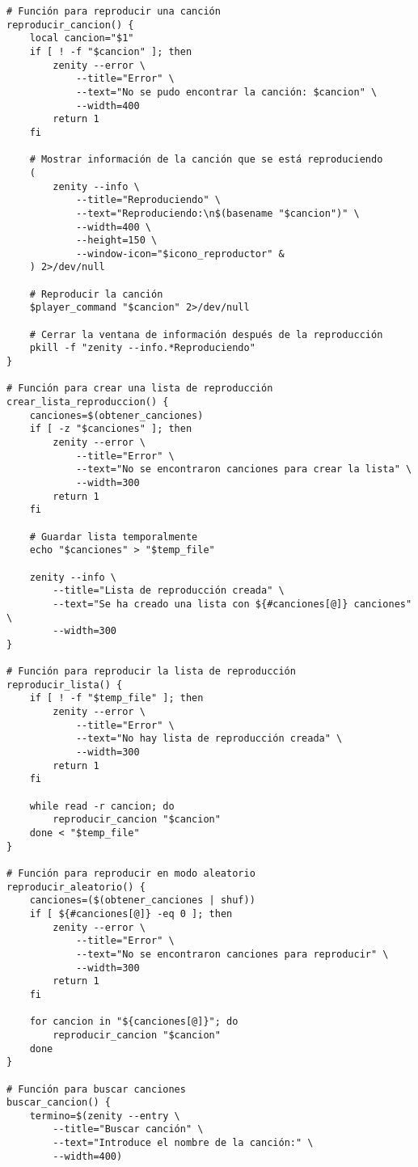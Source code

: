 \documentclass[12pt]{article}
\begin{document}
\begin{lstlisting}[caption={mp3Player.sh}]
# Función para reproducir una canción
reproducir_cancion() {
    local cancion="$1"
    if [ ! -f "$cancion" ]; then
        zenity --error \
            --title="Error" \
            --text="No se pudo encontrar la canción: $cancion" \
            --width=400
        return 1
    fi
    
    # Mostrar información de la canción que se está reproduciendo
    (
        zenity --info \
            --title="Reproduciendo" \
            --text="Reproduciendo:\n$(basename "$cancion")" \
            --width=400 \
            --height=150 \
            --window-icon="$icono_reproductor" &
    ) 2>/dev/null
    
    # Reproducir la canción
    $player_command "$cancion" 2>/dev/null
    
    # Cerrar la ventana de información después de la reproducción
    pkill -f "zenity --info.*Reproduciendo"
}

# Función para crear una lista de reproducción
crear_lista_reproduccion() {
    canciones=$(obtener_canciones)
    if [ -z "$canciones" ]; then
        zenity --error \
            --title="Error" \
            --text="No se encontraron canciones para crear la lista" \
            --width=300
        return 1
    fi
    
    # Guardar lista temporalmente
    echo "$canciones" > "$temp_file"
    
    zenity --info \
        --title="Lista de reproducción creada" \
        --text="Se ha creado una lista con ${#canciones[@]} canciones" \
        --width=300
}

# Función para reproducir la lista de reproducción
reproducir_lista() {
    if [ ! -f "$temp_file" ]; then
        zenity --error \
            --title="Error" \
            --text="No hay lista de reproducción creada" \
            --width=300
        return 1
    fi
    
    while read -r cancion; do
        reproducir_cancion "$cancion"
    done < "$temp_file"
}

# Función para reproducir en modo aleatorio
reproducir_aleatorio() {
    canciones=($(obtener_canciones | shuf))
    if [ ${#canciones[@]} -eq 0 ]; then
        zenity --error \
            --title="Error" \
            --text="No se encontraron canciones para reproducir" \
            --width=300
        return 1
    fi
    
    for cancion in "${canciones[@]}"; do
        reproducir_cancion "$cancion"
    done
}

# Función para buscar canciones
buscar_cancion() {
    termino=$(zenity --entry \
        --title="Buscar canción" \
        --text="Introduce el nombre de la canción:" \
        --width=400)
    

\end{lstlisting}
\end{document}
